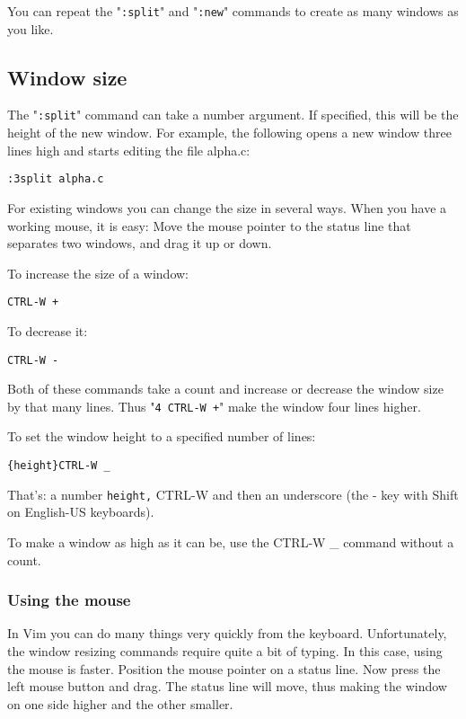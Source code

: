You can repeat the "\texttt{:split}" and "\texttt{:new}" commands to create as many windows as you like.

\subsection{Window size}
The "\texttt{:split}" command can take a number argument.
If specified, this will be the height of the new window.
For example, the following opens a new window three lines high and starts editing the file alpha.c:

 \begin{Verbatim}[samepage=true]
 :3split alpha.c
 \end{Verbatim}

For existing windows you can change the size in several ways.
When you have a working mouse, it is easy: Move the mouse pointer to the status line that separates two windows, and drag it up or down.

To increase the size of a window:

 \begin{Verbatim}[samepage=true]
 CTRL-W +
 \end{Verbatim}

To decrease it:

 \begin{Verbatim}[samepage=true]
 CTRL-W -
 \end{Verbatim}

Both of these commands take a count and increase or decrease the window size by that many lines.
Thus "\texttt{4 CTRL-W +}" make the window four lines higher.

To set the window height to a specified number of lines:

 \begin{Verbatim}[samepage=true]
 {height}CTRL-W _
 \end{Verbatim}

That's: a number \texttt{{height},} CTRL-W and then an underscore (the - key with Shift on English-US keyboards).

To make a window as high as it can be, use the CTRL-W \_ command without a count.

\subsubsection{Using the mouse}
In Vim you can do many things very quickly from the keyboard.
Unfortunately, the window resizing commands require quite a bit of typing.
In this case, using the mouse is faster.
Position the mouse pointer on a status line.
Now press the left mouse button and drag.
The status line will move, thus making the window on one side higher and the other smaller.

